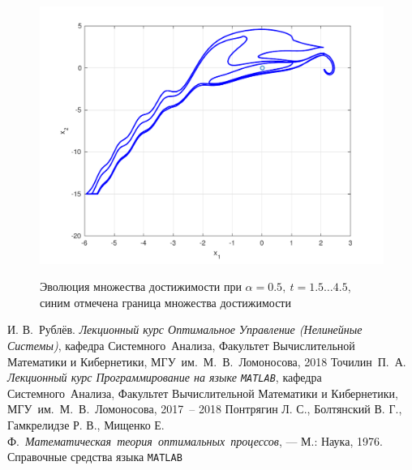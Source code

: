 \documentclass[11pt, oneside, final]{article}
\theoremstyle{break}
\numberwithin{equation}{section}
\theoremstyle{plain}
\theoremstyle{definition}
\begin{document}
    \begin{figure}[!htpb]
            \centering
            \includegraphics[width=\linewidth]{figa05t1545}
            \label{pic:3}
            \caption{Эволюция множества достижимости при \(\alpha = 0.5,\: t = 1.5\dots4.5\), синим отмечена граница множества достижимости}
    \end{figure}
    \pagebreak
    \begin{thebibliography}{0}
         И. В.~Рублёв. \emph{Лекционный курс Оптимальное Управление (Нелинейные Системы)},
        кафедра Системного~Анализа, Факультет Вычислительной Математики и Кибернетики, МГУ~им.~М.~В.~Ломоносова, 
        2018
         Точилин~П.~А. \emph{Лекционный курс Программирование на языке \texttt{MATLAB}},
        кафедра Системного~Анализа, Факультет Вычислительной Математики и Кибернетики, МГУ~им.~М.~В.~Ломоносова, 
        2017~-- 2018
         Понтрягин Л. С., Болтянский В. Г., Гамкрелидзе Р. В., Мищенко Е. Ф.~\emph{Математическая~теория~оптимальных~процессов}, — М.: Наука, 1976.
         Справочные средства языка \texttt{MATLAB}
    \end{thebibliography}
\end{document}
